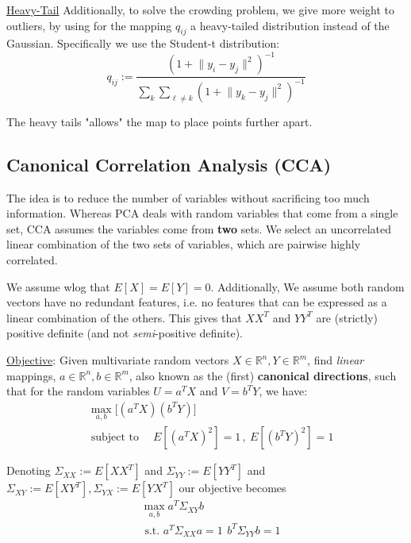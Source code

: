 \documentclass{article}
\begin{document}
\ul{Heavy-Tail} Additionally, to solve the crowding problem, we give more weight to outliers, by using for the mapping $q_{ij}$ a heavy-tailed distribution instead of the Gaussian. Specifically we use the Student-t distribution:
\[
  q_{ij} := \frac{(1 + \lVert y_i-y_j \rVert ^2)^{-1} }{ \sum_{k} \sum_{\ell \neq  k } (1 + \lVert y_k - y_j \rVert ^2 ) ^{-1}}
\]

The heavy tails "allows" the map to place points further apart. 



\subsection{Canonical Correlation Analysis (CCA)}
The idea is to reduce the number of variables without sacrificing too much information. 
Whereas PCA deals with random variables that come from a single set, CCA assumes the variables come from \textbf{two} sets. We select an uncorrelated linear combination of the two sets of variables, which are pairwise highly correlated.

We assume wlog that $E[X] = E[Y] = 0$. Additionally, We assume both random vectors have no redundant features, i.e. no features that can be expressed as a linear combination of the others. This gives that $XX^{T}$ and $YY^{T}$ are (strictly) positive definite (and not \textit{semi}-positive definite). 

\ul{Objective}: Given multivariate random vectors $X \in \mathbb{R}^{n}, Y \in \mathbb{R}^{m}$, find \textit{linear} mappings, $a \in \mathbb{R}^{n}, b \in \mathbb{R}^{m}$, also known as the (first) \textbf{canonical directions}, such that for the random variables $U = a^{T}X$ and $V = b^{T}Y$, we have:
\begin{equation} \label{CCAObjective1}
\begin{aligned}
  & \max_{a,b} \big[ (a^{T} X) (b^{T} Y) \big] \\
  & \operatorname*{\text{subject to}} \quad  E \left[ (a^{T}X)^2 \right] = 1 \,, \  E \left[ (b^{T}Y)^2 \right] = 1 
 \end{aligned}
\end{equation}

Denoting $\Sigma_{XX} :=E[X X^{T}]$ and $\Sigma_{YY} := E[Y Y^{T}]$ and $\Sigma_{XY} := E[X Y^{T}], \Sigma_{YX} := E[Y X^{T}]$ 
our objective becomes
\begin{align} \label{eq:CCAObjective2}
& \max_{a,b} a^{T} \Sigma_{XY} b \\ 
  & \text{ s.t. } a^{T} \Sigma_{XX}a = 1 \, \ b^{T} \Sigma_{YY} b = 1 \label{eq:CCAConstraints}
\end{align}
\end{document}
